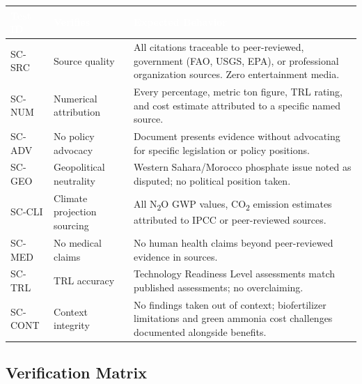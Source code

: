\documentclass[11pt,letterpaper]{article}
\newcommand{\tableheader}[1]{\textbf{\sffamily\textcolor{white}{#1}}}
\begin{document}
\begin{center}
\begin{tabularx}{\textwidth}{C{1.5cm}L{4cm}X}
\toprule
{}
\tableheader{Test ID} & \tableheader{Verifies} & \tableheader{Expected Behavior} \\
\midrule
SC-SRC & Source quality & All citations traceable to peer-reviewed, government (FAO, USGS, EPA), or professional organization sources. Zero entertainment media. \\
SC-NUM & Numerical attribution & Every percentage, metric ton figure, TRL rating, and cost estimate attributed to a specific named source. \\
SC-ADV & No policy advocacy & Document presents evidence without advocating for specific legislation or policy positions. \\
SC-GEO & Geopolitical neutrality & Western Sahara/Morocco phosphate issue noted as disputed; no political position taken. \\
SC-CLI & Climate projection sourcing & All N\textsubscript{2}O GWP values, CO\textsubscript{2} emission estimates attributed to IPCC or peer-reviewed sources. \\
SC-MED & No medical claims & No human health claims beyond peer-reviewed evidence in sources. \\
SC-TRL & TRL accuracy & Technology Readiness Level assessments match published assessments; no overclaiming. \\
SC-CONT & Context integrity & No findings taken out of context; biofertilizer limitations and green ammonia cost challenges documented alongside benefits. \\
\bottomrule
\end{tabularx}
\end{center}

\subsection{Verification Matrix}
\end{document}
